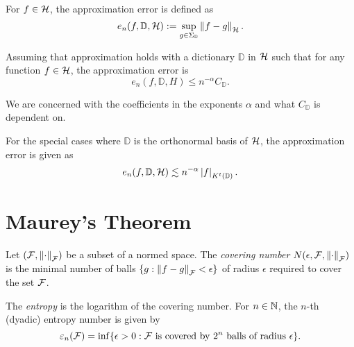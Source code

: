 For $f \in \mathcal{H}$, the approximation error is defined as
\begin{equation}
    \label{eq:appro_err_hilbert}
    e_n(f, \mathbb{D}, \mathcal{H})
        := \sup_{g\in\Sigma_{\mathbb{D}}} \left\| f - g \right\|_{\mathcal{H}}.
\end{equation}

Assuming that approximation holds with a dictionary $\mathbb{D}$ in $\mathcal{H}$
such that for any function $f \in \mathcal{H}$, the approximation error is
\begin{equation}
    \label{eq:appro_error_general}
    e_n(f, \mathbb{D}, H) \leq n^{-\alpha} C_{\mathbb{D}}.
\end{equation}

We are concerned with the coefficients in the exponents $\alpha$ and what
$C_{\mathbb{D}}$ is dependent on.

For the special cases where $\mathbb{D}$ is the orthonormal basis of $\mathcal{H}$,
the approximation error is given as
\begin{equation}
    \label{eq:appro_error_ortho}
    e_n(f, \mathbb{D}, \mathcal{H}) 
        \lesssim n^{-\alpha} \left| f \right|_{K^t(\mathbb{D})}.
\end{equation}

\section{Maurey's Theorem}

\begin{definition}
    \label{def:covering_num}
    Let $(\mathcal{F}, \left\| \cdot \right\|_{\mathcal{F}})$ be a subset of a normed space. The
    \textit{covering number} $N(\epsilon, \mathcal{F}, \left\| \cdot \right\|_{\mathcal{F}})$ is
    the minimal number of balls $\{g: \left\| f - g \right\|_{\mathcal{F}} < \epsilon\}$ of
    radius $\epsilon$ required to cover the set $\mathcal{F}$. 
\end{definition}

\begin{definition}[Entropy]
    \label{def:entropy} The \textit{entropy} is the logarithm of the covering
    number. For $n \in \mathbb{N}$, the $n$-th (dyadic) entropy number is given by
    \begin{equation}
        \varepsilon_{n}({\mathcal{F}})
        = \inf \{
            \epsilon > 0: \mathcal{F} \text{ is covered by } 2^n 
            \text{ balls of radius } \epsilon
        \}.
    \end{equation}
\end{definition}

